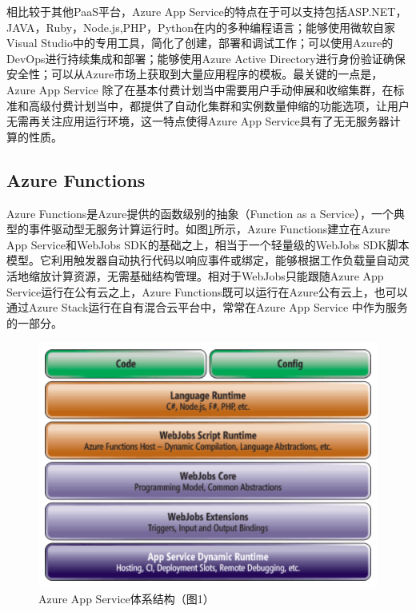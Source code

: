 相比较于其他PaaS平台，Azure App Service的特点在于可以支持包括ASP.NET，JAVA，Ruby，Node.js,PHP，Python在内的多种编程语言；能够使用微软自家Visual Studio中的专用工具，简化了创建，部署和调试工作；可以使用Azure的DevOps进行持续集成和部署；能够使用Azure Active Directory进行身份验证确保安全性；可以从Azure市场上获取到大量应用程序的模板。最关键的一点是，Azure App Service 除了在基本付费计划当中需要用户手动伸展和收缩集群，在标准和高级付费计划当中，都提供了自动化集群和实例数量伸缩的功能选项，让用户无需再关注应用运行环境，这一特点使得Azure App Service具有了无无服务器计算的性质。


\subsection{Azure Functions}
Azure Functions是Azure提供的函数级别的抽象（Function as a Service），一个典型的事件驱动型无服务计算运行时。如图\ref{figs:architecture}所示，Azure Functions建立在Azure App Service和WebJobs SDK的基础之上，相当于一个轻量级的WebJobs SDK脚本模型。它利用触发器自动执行代码以响应事件或绑定，能够根据工作负载量自动灵活地缩放计算资源，无需基础结构管理。相对于WebJobs只能跟随Azure App Service运行在公有云之上，Azure Functions既可以运行在Azure公有云上，也可以通过Azure Stack运行在自有混合云平台中，常常在Azure App Service 中作为服务的一部分。

\begin{figure}[!htbp]
	\centering
	\includegraphics[width=0.5\linewidth]{figs/AzureArchitecture.PNG}
	\caption{Azure App Service体系结构（\cite{archi}图1）}
	\label{figs:architecture}
\end{figure}

